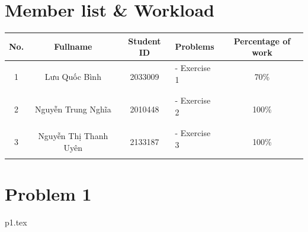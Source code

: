 \documentclass[a4paper]{article}
\begin{document}
    \section{Member list \& Workload}

    \begin{center}
        \begin{tabular}{|c|c|c|l|c|}
            \hline
            \textbf{No.}       & \textbf{Fullname}                      & \textbf{Student ID}       & \textbf{Problems}                 & \textbf{Percentage of work} \\
            \hline
            \multirow{3}{*}{1} & \multirow{3}{*}{Lưu Quốc Bình} & \multirow{3}{*}{2033009}  & - Exercise 1 & \multirow{3}{*}{70\%}\\
            &                                &                           & &                             \\
            &                                &                           & &                             \\
            \hline
            \multirow{3}{*}{2} & \multirow{3}{*}{Nguyễn Trung Nghĩa}  & \multirow{3}{*}{2010448} &- Exercise 2 & \multirow{3}{*}{100\%}\\
            &                                &                           & &                             \\
            &                                &                           & &                             \\
            \hline
            \multirow{3}{*}{3} & \multirow{3}{*}{Nguyễn Thị Thanh Uyên}       & \multirow{3}{*}{2133187} &- Exercise 3 & \multirow{3}{*}{100\%}\\
            &                                &                           & &                             \\
            &                                &                           & &                             \\
            \hline
        \end{tabular}
    \end{center}



    \section{Problem 1}\label{subsec:problem-1}
    {p1.tex}
\end{document}
